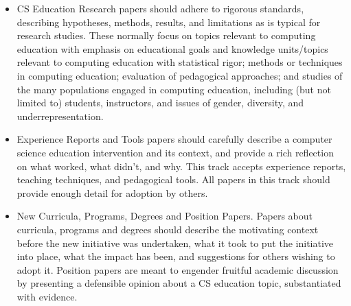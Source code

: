 \documentclass[sigconf]{acmart}
\begin{document}
\begin{itemize}
	\item CS Education Research papers should adhere to rigorous standards, describing hypotheses, methods, results, and
limitations as is typical for research studies. These normally focus on topics relevant to computing education with emphasis on
educational goals and knowledge units/topics relevant to computing education with statistical rigor; methods or techniques in
computing education; evaluation of pedagogical approaches; and studies of the many populations engaged in computing
education, including (but not limited to) students, instructors, and issues of gender, diversity, and underrepresentation.

	\item Experience Reports and Tools papers should carefully describe a computer science education intervention and its context,
and provide a rich reflection on what worked, what didn’t, and why. This track accepts experience reports, teaching
techniques, and pedagogical tools. All papers in this track should provide enough detail for adoption by others.

	\item New Curricula, Programs, Degrees and Position Papers. Papers about curricula, programs and degrees should describe
the motivating context before the new initiative was undertaken, what it took to put the initiative into place, what the impact has
been, and suggestions for others wishing to adopt it. Position papers are meant to engender fruitful academic discussion by
presenting a defensible opinion about a CS education topic, substantiated with evidence.
\end{itemize}











\end{document}

